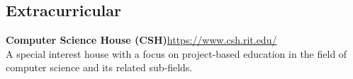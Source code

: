 \documentclass[letterpaper,margin,line,11pt]{resume}
\newcommand{\rurl}[1]{\hfill {\footnotesize \url{#1}}}
\begin{document}
\begin{resume}
\section{\mysidestyle Extracurricular}
	\begin{asparablank}
		\item{\bf{}Computer Science House ({\small CSH})}\rurl{https://www.csh.rit.edu/}
        \\
		A special interest house with a focus on project-based education in the field of computer science and its related sub-fields.
	\end{asparablank}

\end{resume}
\end{document}
